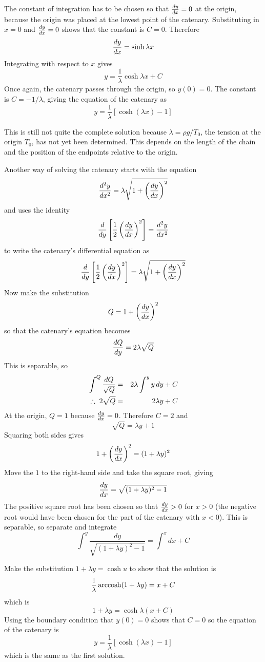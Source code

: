 \begin{example}
The constant of integration has to be chosen so that $\frac{dy}{dx}=0$ at the
origin, because the origin was placed at the lowest point of the catenary.
Substituting in $x=0$ and $\frac{dy}{dx}=0$ shows that the constant is $C=0$.
Therefore
$$\frac{dy}{dx}=\sinh\lambda x$$
Integrating with respect to $x$ gives
$$y=\frac{1}{\lambda}\cosh\lambda x+C$$
Once again, the catenary passes through the origin, so $y(0)=0$.  The
constant is $C=-1/\lambda$, giving the equation of the catenary as
$$y=\frac{1}{\lambda}\left[\cosh\left(\lambda x\right)-1\right]$$

This is still not quite the complete solution because 
$\lambda=\rho g/T_0$, the tension at the origin $T_0$, has
not yet been determined.  This depends on the length of the chain and the
position of the endpoints relative to the origin. 

\parbreak

Another way of solving the catenary starts with the equation
$$\frac{d^2y}{d{x}^2}=\lambda\sqrt{1+\left(\frac{dy}{dx}\right)^2}$$
and uses the identity
$$\frac{d}{d{y}}\left[\frac{1}{2}\left(\frac{dy}{dx}\right)^2\right]=\frac{d^2y}{d{x}^2}$$
to write the catenary's differential equation as
$$\frac{d}{d{y}}\left[\frac{1}{2}\left(\frac{dy}{dx}\right)^2\right]
=\lambda\sqrt{1+\left(\frac{dy}{dx}\right)^2}$$
Now make the substitution
$$Q=1+\left(\frac{dy}{dx}\right)^2$$
so that the catenary's equation becomes
$$\frac{dQ}{dy}=2\lambda \sqrt{Q}$$
This is separable, so
\begin{eqnarray*}
\int^Q \frac{dQ}{\sqrt{Q}}&=&2\lambda \int^y y\,dy+C \\
\;\therefore\; 2\sqrt{Q}&=&2\lambda y+C
\end{eqnarray*}
At the origin, $Q=1$ because $\frac{dy}{dx}=0$.  Therefore $C=2$ and 
$$\sqrt{Q}=\lambda y+1$$
Squaring both sides gives
$$1+\left(\frac{dy}{dx}\right)^2=(1+\lambda y)^2$$
Move the $1$ to the right-hand side and take the square root, giving
$$\frac{dy}{dx}=\sqrt{(1+\lambda y)^2-1}$$
The positive  square root has been chosen so that $\frac{dy}{dx}>0$ for $x>0$
(the negative root would have been chosen for the part of the catenary with
$x<0$).  This is separable, so separate and integrate
$$\int^y\frac{dy}{\sqrt{(1+\lambda y)^2-1}}=\int^x dx+C$$

Make the substitution $1+\lambda y=\cosh u$ to show that the solution is
$$\frac{1}{\lambda}\operatorname{arccosh}(1+\lambda y)=x+C$$
which is
$$1+\lambda y=\cosh\lambda(x+C)$$
Using the boundary condition that $y(0)=0$ shows that $C=0$ so the equation
of the catenary is
$$y=\frac{1}{\lambda}\left[\cosh\left(\lambda x\right)-1\right]$$
which is the same as the first solution.
\end{example}


